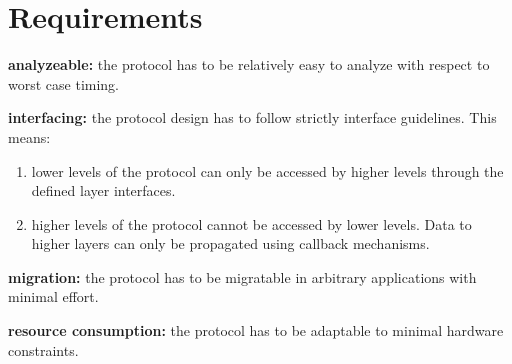 \section{Requirements}
\label{sec:bus:requirements}

\begin{req}
\label{req:ulftrtp:analyzeable}
\textbf{analyzeable: }the protocol has to be relatively easy to analyze with respect to worst case timing.
\end{req}

\begin{req}
\label{req:ulftrtp:interfacing}
\textbf{interfacing: }the protocol design has to follow strictly interface guidelines. This means:
\begin{enumerate}
 \item lower levels of the protocol can only be accessed by higher levels through the defined layer interfaces.
 \item higher levels of the protocol cannot be accessed by lower levels. Data to higher layers can only be propagated using callback mechanisms. 
\end{enumerate}

\end{req}

\begin{req}
\label{req:ulftrtp:easy migration}
\textbf{migration: }the protocol has to be migratable in arbitrary applications with minimal effort.
\end{req}

\begin{req}
\label{req:ulftrtp:resource consumption}
\textbf{resource consumption: }the protocol has to be adaptable to minimal hardware constraints.
\end{req}
